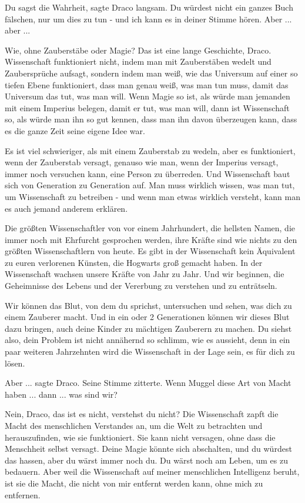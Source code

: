 \glqq{}Du sagst die Wahrheit\grqq{}, sagte Draco langsam. \glqq{}Du würdest
nicht ein ganzes Buch fälschen, nur um dies zu tun - und ich kann es in deiner
Stimme hören. Aber ... aber ...\grqq{}

\glqq{}Wie, ohne Zauberstäbe oder Magie? Das ist eine lange Geschichte, Draco.
Wissenschaft funktioniert nicht, indem man mit Zauberstäben wedelt und
Zaubersprüche aufsagt, sondern indem man weiß, wie das Universum auf einer so
tiefen Ebene funktioniert, dass man genau weiß, was man tun muss, damit das
Universum das tut, was man will. Wenn Magie so ist, als würde man jemanden mit
einem Imperius belegen, damit er tut, was man will, dann ist Wissenschaft so,
als würde man ihn so gut kennen, dass man ihn davon überzeugen kann, dass es die
ganze Zeit seine eigene Idee war.

Es ist viel schwieriger, als mit einem Zauberstab zu wedeln, aber es
funktioniert, wenn der Zauberstab versagt, genauso wie man, wenn der Imperius
versagt, immer noch versuchen kann, eine Person zu überreden. Und Wissenschaft
baut sich von Generation zu Generation auf. Man muss wirklich wissen, was man
tut, um Wissenschaft zu betreiben - und wenn man etwas wirklich versteht, kann
man es auch jemand anderem erklären.

Die größten Wissenschaftler von vor einem Jahrhundert, die hellsten Namen, die
immer noch mit Ehrfurcht gesprochen werden, ihre Kräfte sind wie nichts zu den
größten Wissenschaftlern von heute. Es gibt in der Wissenschaft kein Äquivalent
zu euren verlorenen Künsten, die Hogwarts groß gemacht haben. In der
Wissenschaft wachsen unsere Kräfte von Jahr zu Jahr. Und wir beginnen, die
Geheimnisse des Lebens und der Vererbung zu verstehen und zu enträtseln.

Wir können das Blut, von dem du sprichst, untersuchen und sehen, was dich zu
einem Zauberer macht. Und in ein oder 2 Generationen können wir dieses Blut dazu
bringen, auch deine Kinder zu mächtigen Zauberern zu machen. Du siehst also,
dein Problem ist nicht annähernd so schlimm, wie es aussieht, denn in ein paar
weiteren Jahrzehnten wird die Wissenschaft in der Lage sein, es für dich zu
lösen.\grqq{}

\glqq{}Aber ...\grqq{} sagte Draco. Seine Stimme zitterte. \glqq{}Wenn Muggel
diese Art von Macht haben ... dann ... was sind wir?\grqq{}

\glqq{}Nein, Draco, das ist es nicht, verstehst du nicht? Die Wissenschaft zapft
die Macht des menschlichen Verstandes an, um die Welt zu betrachten und
herauszufinden, wie sie funktioniert. Sie kann nicht versagen, ohne dass die
Menschheit selbst versagt. Deine Magie könnte sich abschalten, und du würdest
das hassen, aber du wärst immer noch du. Du wärst noch am Leben, um es zu
bedauern. Aber weil die Wissenschaft auf meiner menschlichen Intelligenz beruht,
ist sie die Macht, die nicht von mir entfernt werden kann, ohne mich zu
entfernen.

